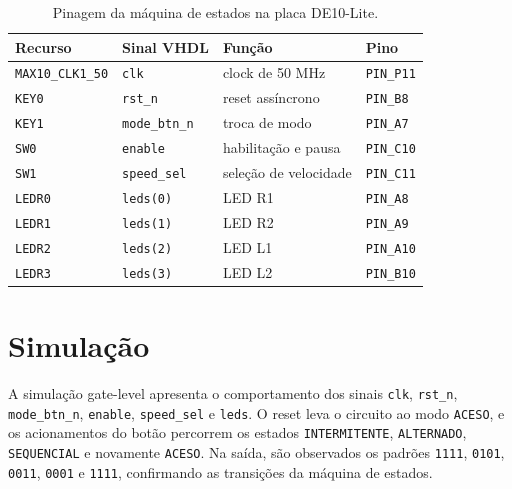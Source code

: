 \documentclass[12pt,a4paper, brazil]{article}
\begin{document}
\begin{table}[H]
\centering
\caption{Pinagem da máquina de estados na placa DE10-Lite.}
\label{tab:pinagem}
\begin{tabular}{@{}llll@{}}
\toprule
\textbf{Recurso} & \textbf{Sinal VHDL} & \textbf{Função} & \textbf{Pino} \\
\midrule
\texttt{MAX10\_CLK1\_50} & \texttt{clk}          & clock de 50 MHz       & \texttt{PIN\_P11} \\
\texttt{KEY0}            & \texttt{rst\_n}       & reset assíncrono      & \texttt{PIN\_B8}  \\
\texttt{KEY1}            & \texttt{mode\_btn\_n} & troca de modo         & \texttt{PIN\_A7}  \\
\texttt{SW0}             & \texttt{enable}       & habilitação e pausa   & \texttt{PIN\_C10} \\
\texttt{SW1}             & \texttt{speed\_sel}   & seleção de velocidade & \texttt{PIN\_C11} \\
\texttt{LEDR0}           & \texttt{leds(0)}      & LED R1                & \texttt{PIN\_A8}  \\
\texttt{LEDR1}           & \texttt{leds(1)}      & LED R2                & \texttt{PIN\_A9}  \\
\texttt{LEDR2}           & \texttt{leds(2)}      & LED L1                & \texttt{PIN\_A10} \\
\texttt{LEDR3}           & \texttt{leds(3)}      & LED L2                & \texttt{PIN\_B10} \\
\bottomrule
\end{tabular}
\end{table}
\FloatBarrier

\section{Simulação}

A simulação gate-level apresenta o comportamento dos sinais \texttt{clk}, \texttt{rst\_n}, \texttt{mode\_btn\_n}, \texttt{enable}, \texttt{speed\_sel} e \texttt{leds}. O reset leva o circuito ao modo \texttt{ACESO}, e os acionamentos do botão percorrem os estados \texttt{INTERMITENTE}, \texttt{ALTERNADO}, \texttt{SEQUENCIAL} e novamente \texttt{ACESO}. Na saída, são observados os padrões \texttt{1111}, \texttt{0101}, \texttt{0011}, \texttt{0001} e \texttt{1111}, confirmando as transições da máquina de estados.
\end{document}
